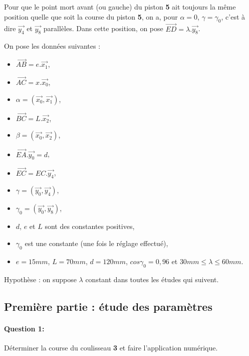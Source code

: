 Pour que le point mort avant (ou gauche) du piston \textbf{5} ait toujours la même position quelle que soit la course du piston \textbf{5}, on a, pour $\alpha=0$, $\gamma=\gamma_0$, c'est à dire $\overrightarrow{y_4}$ et $\overrightarrow{y_8}$ parallèles. Dans cette position, on pose $\overrightarrow{ED}=\lambda.\overrightarrow{y_8}$.

\newpage

On pose les données suivantes :

\begin{minipage}{0.3\linewidth}
\begin{itemize}
 \item $\overrightarrow{AB}=e.\overrightarrow{x_1}$,
 \item $\overrightarrow{AC}=x.\overrightarrow{x_0}$,
 \item $\alpha=(\overrightarrow{x_0}, \overrightarrow{x_1})$,
 \item $\overrightarrow{BC}=L.\overrightarrow{x_2}$,
 \item $\beta=(\overrightarrow{x_0}, \overrightarrow{x_2})$,
 \item $\overrightarrow{EA}.\overrightarrow{y_0}=d$,
 \item $\overrightarrow{EC}=EC.\overrightarrow{y_4}$,
\end{itemize}
\end{minipage}\hfill
\begin{minipage}{0.65\linewidth}
\begin{itemize}
 \item $\gamma=(\overrightarrow{y_0}, \overrightarrow{y_4})$,
 \item $\gamma_0=(\overrightarrow{y_0}, \overrightarrow{y_8})$,
 \item $d$, $e$ et $L$ sont des constantes positives,
 \item $\gamma_0$ est une constante (une fois le réglage effectué),
 \item $e=15mm$, $L=70mm$, $d=120mm$, $cos\gamma_0=0,96$ et $30mm\leq\lambda\leq60mm$.
\end{itemize}
Hypothèse : on suppose $\lambda$ constant dans toutes les études qui suivent.
\end{minipage}

\subsection{Première partie : étude des paramètres}

\paragraph{Question 1:} Déterminer la course du coulisseau \textbf{3} et faire l'application numérique.

